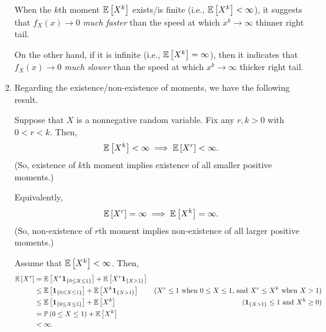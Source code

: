 \begin{enumerate}
When the \(k\)th moment \(\mathbb{E}\left[X^k\right]\) exists/is finite (i.e.,
\(\mathbb{E}\left[X^k\right]<\infty\)), it suggests that \(f_X(x)\to 0\) \emph{much faster} than the
speed at which \(x^k\to\infty\)  thinner right tail.

On the other hand, if it is infinite (i.e., \(\mathbb{E}\left[X^k\right]=\infty\)), then it
indicates that \(f_X(x)\to 0\) \emph{much slower} than the speed at which
\(x^k\to\infty\)  thicker right tail.

\item Regarding the existence/non-existence of moments, we have the following
result.
\begin{proposition}
\label{prp:high-low-moment-relation}
Suppose that \(X\) is a nonnegative random variable. Fix any \(r,k>0\) with
\(0<r<k\). Then,
\[
\mathbb{E}\left[X^k\right]<\infty\implies \mathbb{E}\left[X^r\right]<\infty.
\]
(So, existence of \(k\)th moment implies existence of
all smaller positive moments.)

\begin{note}
Equivalently,
\[
\mathbb{E}\left[X^r\right]=\infty\implies \mathbb{E}\left[X^k\right]=\infty.
\]
(So, non-existence of \(r\)th moment implies non-existence of
all larger positive moments.)
\end{note}
\end{proposition}
\begin{pf}
Assume that \(\mathbb{E}\left[X^k\right]<\infty\). Then,
\begin{align*}
\mathbb{E}\left[X^r\right]&=\mathbb{E}\left[X^r\mathbf{1}_{\left\{0\le X\le 1\right\}}\right]+\mathbb{E}\left[X^r\mathbf{1}_{\left\{X>1\right\}}\right]\\
&\le \mathbb{E}\left[\mathbf{1}_{\left\{0\le X\le 1\right\}}\right]+\mathbb{E}\left[X^k\mathbf{1}_{\left\{X>1\right\}}\right] &\text{(\(X^r \le 1\) when \(0\le X\le 1\), and \(X^r\le X^k\) when \(X>1\))}\\
&\le \mathbb{E}\left[\mathbf{1}_{\left\{0\le X\le 1\right\}}\right]+\mathbb{E}\left[X^k\right]&\text{(\(\mathbf{1}_{\left\{X>1\right\}}\le 1\) and \(X^k\ge 0\))}\\
&=\mathbb{P}\left(0\le X\le 1\right)+\mathbb{E}\left[X^k\right]\\
&<\infty.
\end{align*}
\end{pf}


\end{enumerate}

